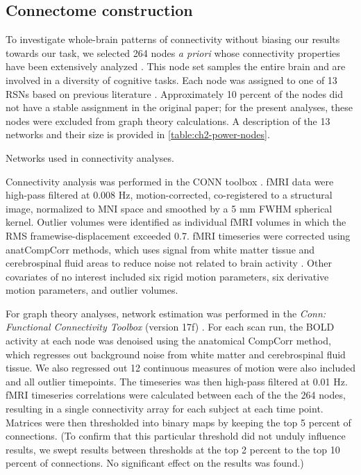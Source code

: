 \subsection{Connectome construction}

To investigate whole-brain patterns of connectivity without biasing our results towards our task, we selected 264 nodes \textit{a priori} whose connectivity properties have been extensively analyzed \citep{Power2011}. This node set samples the entire brain and are involved in a diversity of cognitive tasks. Each node was assigned to one of 13 RSNs based on previous literature \citep{Power2013}. Approximately 10 percent of the nodes did not have a stable assignment in the original paper; for the present analyses, these nodes were excluded from graph theory calculations. A description of the 13 networks and their size is provided in \ref{table:ch2-power-nodes}. 

\begin{table}
	\renewcommand{\tabcolsep}{0.09cm}
	\centering
	
	\caption{Networks used in connectivity analyses.}
	\label{table:ch2-power-nodes}
\end{table}

Connectivity analysis was performed in the CONN toolbox \citep{WhitfieldGabrieli2012}. fMRI data were high-pass filtered at 0.008 Hz, motion-corrected, co-registered to a structural image, normalized to MNI space and smoothed by a 5 mm FWHM spherical kernel. Outlier volumes were identified as individual fMRI volumes in which the RMS framewise-displacement exceeded 0.7. fMRI timeseries were corrected using anatCompCorr methods, which uses signal from white matter tissue and cerebrospinal fluid areas to reduce noise not related to brain activity \citep{Chai2012}. Other covariates of no interest included six rigid motion parameters, six derivative motion parameters, and outlier volumes. 

For graph theory analyses, network estimation was performed in the \textit{Conn: Functional Connectivity Toolbox} (version 17f) \citep{WhitfieldGabrieli2012}. For each scan run, the BOLD activity at each node was denoised using the anatomical CompCorr method, which regresses out background noise from white matter and cerebrospinal fluid tissue. We also regressed out 12 continuous measures of motion were also included and all outlier timepoints. The timeseries was then high-pass filtered at 0.01 Hz. fMRI timeseries correlations were calculated between each of the the 264 nodes, resulting in a single connectivity array for each subject at each time point. Matrices were then thresholded into binary maps by keeping the top 5 percent of connections. (To confirm that this particular threshold did not unduly influence results, we swept results between thresholds at the top 2 percent to the top 10 percent of connections. No significant effect on the results was found.)

